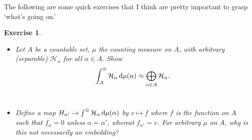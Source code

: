 \documentclass[11pt]{amsart}
\newtheorem{ex}{Exercise}
\newcommand{\M}{\mathcal{M}}
\newcommand{\hsp}{\hspace{1mm}}
\renewcommand{\H}{\mathcal{H}}
\newcommand{\set}[2]{\left\{ #1 \hsp| \hsp #2\right\}}
\begin{document}
The following are some quick exercises that I think are pretty important to grasp `what's going on.'
\begin{ex}
\begin{itemize}
		\item Let $A$ be a countable set, $\mu$ the counting measure on $A$, with arbitrary (separable) $\H_{\alpha}$ for all $\alpha \in A$.  Show
				\begin{align*}
					\int^{\oplus}_{A}\H_{\alpha}\dop \mu(\alpha) \approx \bigoplus_{\alpha \in A} \H_{\alpha}. 
				\end{align*}\\
		\item  Define a map $H_{\alpha'}\to \int^{\oplus}\H_{\alpha}\dop \mu(\alpha)$ by $v \mapsto f$ where $f$ is the function on $A$ such that $f_{\alpha}=0$ unless $\alpha=\alpha'$, whereat $f_{\alpha'}=v$. For arbitrary $\mu$ on $A$, why is this not necessarily an embedding? 		
\end{itemize}
\end{ex}
\end{document}

